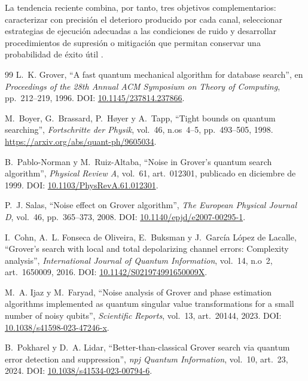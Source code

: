 \documentclass[11pt,a4paper]{article}
\begin{document}
La tendencia reciente combina, por tanto, tres objetivos complementarios: caracterizar con precisión el deterioro producido por cada canal, seleccionar estrategias de ejecución adecuadas a las condiciones de ruido y desarrollar procedimientos de supresión o mitigación que permitan conservar una probabilidad de éxito útil \cite{pokharel2024,leng2025,khan2026}.

\begin{thebibliography}{99}
L.~K. Grover, ``A fast quantum mechanical algorithm for database search'', en \emph{Proceedings of the 28th Annual ACM Symposium on Theory of Computing}, pp.~212--219, 1996. DOI: \href{https://doi.org/10.1145/237814.237866}{10.1145/237814.237866}.

M.~Boyer, G.~Brassard, P.~H\o yer y A.~Tapp, ``Tight bounds on quantum searching'', \emph{Fortschritte der Physik}, vol.~46, n.os~4--5, pp.~493--505, 1998. \url{https://arxiv.org/abs/quant-ph/9605034}.

B.~Pablo-Norman y M.~Ruiz-Altaba, ``Noise in Grover's quantum search algorithm'', \emph{Physical Review A}, vol.~61, art.~012301, publicado en diciembre de 1999. DOI: \href{https://doi.org/10.1103/PhysRevA.61.012301}{10.1103/PhysRevA.61.012301}.

P.~J. Salas, ``Noise effect on Grover algorithm'', \emph{The European Physical Journal D}, vol.~46, pp.~365--373, 2008. DOI: \href{https://doi.org/10.1140/epjd/e2007-00295-1}{10.1140/epjd/e2007-00295-1}.

I.~Cohn, A.~L. Fonseca de Oliveira, E.~Buksman y J.~García López de Lacalle, ``Grover's search with local and total depolarizing channel errors: Complexity analysis'', \emph{International Journal of Quantum Information}, vol.~14, n.o~2, art.~1650009, 2016. DOI: \href{https://doi.org/10.1142/S021974991650009X}{10.1142/S021974991650009X}.

M.~A. Ijaz y M.~Faryad, ``Noise analysis of Grover and phase estimation algorithms implemented as quantum singular value transformations for a small number of noisy qubits'', \emph{Scientific Reports}, vol.~13, art.~20144, 2023. DOI: \href{https://doi.org/10.1038/s41598-023-47246-x}{10.1038/s41598-023-47246-x}.

B.~Pokharel y D.~A. Lidar, ``Better-than-classical Grover search via quantum error detection and suppression'', \emph{npj Quantum Information}, vol.~10, art.~23, 2024. DOI: \href{https://doi.org/10.1038/s41534-023-00794-6}{10.1038/s41534-023-00794-6}.


\end{thebibliography}
\end{document}
